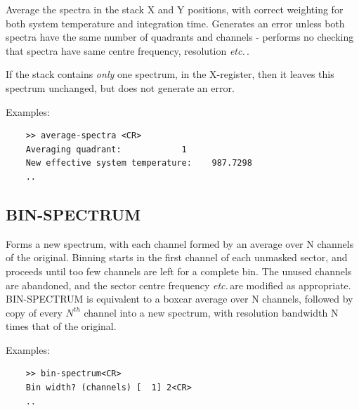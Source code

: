 \documentclass[11pt,twoside]{report}
\newcommand{\etc}{{\it etc.\,}}
\begin{document}
Average the spectra in the stack X and Y positions, with correct weighting
for both system temperature and integration time. Generates an error unless
both spectra have the same number of quadrants and channels - performs no
checking that spectra have same centre frequency, resolution \etc.

If the stack contains {\em only} one spectrum, in the X-register, then it
leaves this spectrum unchanged, but does not generate an error.

Examples:
\begin{verbatim}
    >> average-spectra <CR>
    Averaging quadrant:            1
    New effective system temperature:    987.7298    
    ..
\end{verbatim}

\subsection{BIN-SPECTRUM} 

Forms a new spectrum, with each channel formed by an average over N channels of
the original. Binning starts in the first channel of each unmasked sector, and
proceeds until too few channels are left for a complete bin. The unused
channels are abandoned, and the sector centre frequency \etc are modified as
appropriate. BIN-SPECTRUM is equivalent to a boxcar average over N channels,
followed by copy of every $N^{th}$ channel into a new spectrum, with resolution
bandwidth N times that of the original. 

Examples:
\begin{verbatim}
    >> bin-spectrum<CR>
    Bin width? (channels) [  1] 2<CR>
    ..
\end{verbatim}
\end{document}
